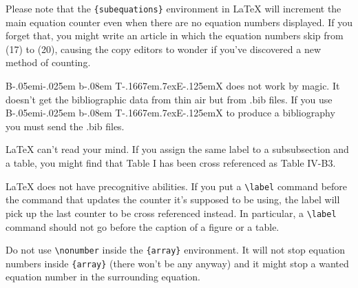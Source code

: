 \documentclass[conference]{IEEEtran}
\def\BibTeX{{\rm B\kern-.05em{\sc i\kern-.025em b}\kern-.08em
    T\kern-.1667em\lower.7ex\hbox{E}\kern-.125emX}}
\begin{document}
Please note that the \verb|{subequations}| environment in {\LaTeX}
will increment the main equation counter even when there are no
equation numbers displayed. If you forget that, you might write an
article in which the equation numbers skip from (17) to (20), causing
the copy editors to wonder if you've discovered a new method of
counting.

{\BibTeX} does not work by magic. It doesn't get the bibliographic
data from thin air but from .bib files. If you use {\BibTeX} to produce a
bibliography you must send the .bib files. 

{\LaTeX} can't read your mind. If you assign the same label to a
subsubsection and a table, you might find that Table I has been cross
referenced as Table IV-B3. 

{\LaTeX} does not have precognitive abilities. If you put a
\verb|\label| command before the command that updates the counter it's
supposed to be using, the label will pick up the last counter to be
cross referenced instead. In particular, a \verb|\label| command
should not go before the caption of a figure or a table.

Do not use \verb|\nonumber| inside the \verb|{array}| environment. It
will not stop equation numbers inside \verb|{array}| (there won't be
any anyway) and it might stop a wanted equation number in the
surrounding equation.
\end{document}
